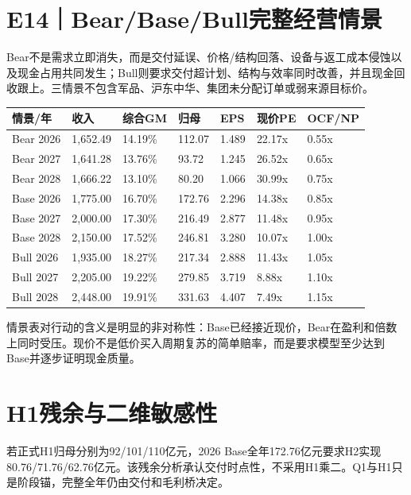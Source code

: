 \section{E14｜Bear/Base/Bull完整经营情景}

Bear不是需求立即消失，而是交付延误、价格/结构回落、设备与返工成本侵蚀以及现金占用共同发生；Bull则要求交付超计划、结构与效率同时改善，并且现金回收跟上。三情景不包含军品、沪东中华、集团未分配订单或弱来源目标价。

\begin{exhibitbox}[2026--2028三情景结果]
\scriptsize
\begin{tabularx}{\exhibitboxwidth}{L{1.8cm}R{2.0cm}C{1.8cm}R{2.0cm}R{1.8cm}R{1.8cm}Y}
\toprule
\textbf{情景/年} & \textbf{收入} & \textbf{综合GM} & \textbf{归母} & \textbf{EPS} & \textbf{现价PE} & \textbf{OCF/NP} \\
\midrule
Bear 2026 & 1,652.49 & 14.19\% & 112.07 & 1.489 & 22.17x & 0.55x \\
Bear 2027 & 1,641.28 & 13.76\% & 93.72 & 1.245 & 26.52x & 0.65x \\
Bear 2028 & 1,666.22 & 13.10\% & 80.20 & 1.066 & 30.99x & 0.75x \\
 Base 2026 & 1,775.00 & 16.70\% & 172.76 & 2.296 & 14.38x & 0.85x \\
 Base 2027 & 2,000.00 & 17.30\% & 216.49 & 2.877 & 11.48x & 0.95x \\
 Base 2028 & 2,150.00 & 17.52\% & 246.81 & 3.280 & 10.07x & 1.00x \\
Bull 2026 & 1,935.00 & 18.27\% & 217.34 & 2.888 & 11.43x & 1.05x \\
Bull 2027 & 2,205.00 & 19.22\% & 279.85 & 3.719 & 8.88x & 1.10x \\
Bull 2028 & 2,448.00 & 19.91\% & 331.63 & 4.407 & 7.49x & 1.15x \\
\bottomrule
\end{tabularx}
\end{exhibitbox}

情景表对行动的含义是明显的非对称性：Base已经接近现价，Bear在盈利和倍数上同时受压。现价不是低价买入周期复苏的简单赔率，而是要求模型至少达到Base并逐步证明现金质量。

\section{H1残余与二维敏感性}

若正式H1归母分别为92/101/110亿元，2026 Base全年172.76亿元要求H2实现80.76/71.76/62.76亿元。该残余分析承认交付时点性，不采用H1乘二。Q1与H1只是阶段锚，完整全年仍由交付和毛利桥决定。

